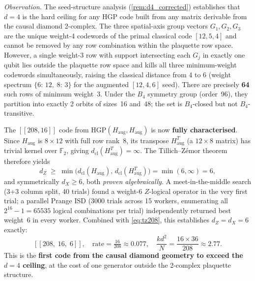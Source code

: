 \documentclass[12pt,a4paper]{article}
\theoremstyle{plain}
\theoremstyle{definition}
\theoremstyle{remark}
\newcommand{\GFtwo}{\mathbb{F}_2}
\begin{document}
\begin{description}[style=nextline]
\item[(O6$'$) Augmented-seed HGP and the $d=4$ ceiling — \emph{resolved}.]
\emph{Observation.}
The seed-structure analysis (\cref{rem:d4_corrected}) establishes
that $d=4$ is the hard ceiling for any HGP code built from any matrix
derivable from the causal diamond 2-complex.
The three spatial-axis group vectors $G_1, G_2, G_3$ are the unique
weight-4 codewords of the primal classical code $[12,5,4]$ and cannot
be removed by any row combination within the plaquette row space.
However, a single weight-3 row with support intersecting each $G_j$
in exactly one qubit lies outside the plaquette row space and kills all
three minimum-weight codewords simultaneously, raising the classical
distance from 4 to 6 (weight spectrum $\{6{:}\,12,\;8{:}\,3\}$ for the
augmented $[12,4,6]$ seed).
There are precisely \textbf{64} such rows of minimum weight~3.
Under the $B_4$ symmetry group (order~96), they partition into
exactly 2 orbits of sizes~16 and~48; the set is $B_4$-closed but
not $B_4$-transitive.

The $[[208,16]]$ code from $\mathrm{HGP}(H_{\mathrm{aug}}, H_{\mathrm{aug}})$
is now \textbf{fully characterised}.
Since $H_{\mathrm{aug}}$ is $8\times 12$ with full row rank~8,
its transpose $H_{\mathrm{aug}}^T$ (a $12\times 8$ matrix) has trivial
kernel over $\GFtwo$, giving $d_{\mathrm{cl}}(H_{\mathrm{aug}}^T)=\infty$.
The Tillich--Z\'emor theorem therefore yields
\begin{equation}
  d_Z \;\geq\; \min\!\bigl(d_{\mathrm{cl}}(H_{\mathrm{aug}}),\,
  d_{\mathrm{cl}}(H_{\mathrm{aug}}^T)\bigr) = \min(6,\infty) = 6,
  \label{eq:tz208}
\end{equation}
and symmetrically $d_X \geq 6$, both \emph{proven algebraically}.
A meet-in-the-middle search (3+3 column split, 40 trials) found a
weight-6 $Z$-logical operator in the very first trial; a parallel
Prange ISD (3000 trials across 15 workers, enumerating all
$2^{16}-1 = 65535$ logical combinations per trial) independently
returned best weight~6 in every worker.
Combined with \cref{eq:tz208}, this establishes $d_Z = d_X = 6$ exactly:
\[
  [[208,\;16,\;6]],
  \quad
  \text{rate} = \tfrac{16}{208} \approx 0.077,
  \quad
  \frac{k d^2}{N} = \frac{16\times 36}{208} \approx 2.77.
\]
This is the \textbf{first code from the causal diamond geometry to exceed
the $d=4$ ceiling}, at the cost of one generator outside the 2-complex
plaquette structure.


\end{description}
\end{document}
